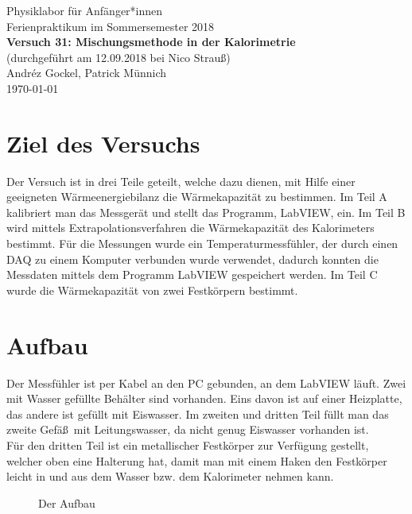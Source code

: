 \documentclass[11pt,a4paper]{article}
\begin{document}
{
\centering 
\large 
Physiklabor für Anf\"anger*innen \\
Ferienpraktikum im Sommersemester 2018 \\[4mm]
\textbf{\LARGE 
Versuch 31: Mischungsmethode in der Kalorimetrie
} \\[3mm]
(durchgef\"uhrt am 12.09.2018 bei Nico Strauß) \\
Andréz Gockel, Patrick M\"unnich\\
\today \\[10mm]
}

\tableofcontents

\pagebreak

\section{Ziel des Versuchs}


Der Versuch ist in drei Teile geteilt, welche dazu dienen, mit Hilfe einer geeigneten Wärmeenergiebilanz die Wärmekapazität zu bestimmen. Im Teil A kalibriert man das Messgerät und stellt das Programm, LabVIEW, ein. Im Teil B wird mittels Extrapolationsverfahren die Wärmekapazität des Kalorimeters bestimmt. Für die Messungen wurde ein Temperaturmessfühler, der durch einen DAQ zu einem Komputer verbunden wurde verwendet, dadurch konnten die Messdaten mittels dem Programm LabVIEW gespeichert werden. Im Teil C wurde die Wärmekapazität von zwei Festkörpern bestimmt. 

\section{Aufbau}

Der Messf\"uhler ist per Kabel an den PC gebunden, an dem LabVIEW l\"auft. Zwei mit Wasser gef\"ullte Beh\"alter sind vorhanden. Eins davon ist auf einer Heizplatte, das andere ist gef\"ullt mit Eiswasser. Im zweiten und dritten Teil f\"ullt man das zweite Gef\"a\ss\ mit Leitungswasser, da nicht genug Eiswasser vorhanden ist.\\
F\"ur den dritten Teil ist ein metallischer Festk\"orper zur Verf\"ugung gestellt, welcher oben eine Halterung hat, damit man mit einem Haken den Festk\"orper leicht in und aus dem Wasser bzw. dem Kalorimeter nehmen kann.

\begin{figure}[ht!]
	\centering
  	\renewcommand\thefigure{B1}
	\caption{Der Aufbau}
	\label{Bild:1}
\end{figure}
\end{document}
